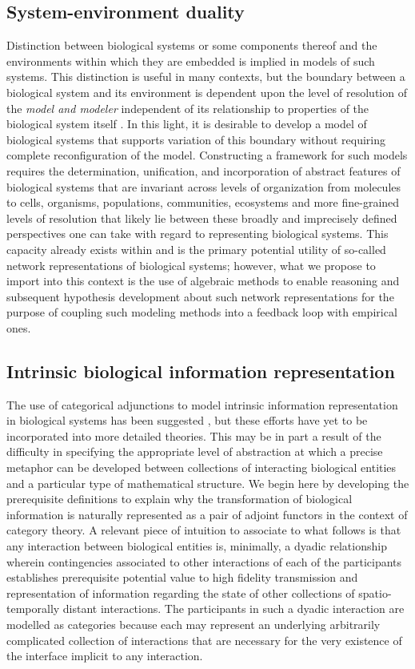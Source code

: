 \documentclass[aps,twocolumn]{revtex4-1}
\begin{document}
\subsection{System-environment duality}
Distinction between biological systems or some components thereof and the environments within which they are embedded is implied in models of such systems. This distinction is useful in many contexts, but the boundary between a biological system and its environment is dependent upon the level of resolution of the \emph{model and modeler} independent of its relationship to properties of the biological system itself \cite{Fontana1996}. In this light, it is desirable to develop a model of biological systems that supports variation of this boundary without requiring complete reconfiguration of the model. Constructing a framework for such models requires the determination, unification, and incorporation of abstract features of biological systems that are invariant across levels of organization from molecules to cells, organisms, populations, communities, ecosystems and more fine-grained levels of resolution that likely lie between these broadly and imprecisely defined perspectives one can take with regard to representing biological systems. This capacity already exists within and is the primary potential utility of so-called network representations of biological systems; however, what we propose to import into this context is the use of algebraic methods to enable reasoning and subsequent hypothesis development about such network representations for the purpose of coupling such modeling methods into a feedback loop with empirical ones.

\subsection{Intrinsic biological information representation}
The use of categorical adjunctions to model intrinsic information representation in biological systems has been suggested \cite{GOGUEN1979,Ellerman2005}, but these efforts have yet to be incorporated into more detailed theories. This may be in part a result of the difficulty in specifying the appropriate level of abstraction at which a precise metaphor can be developed between collections of interacting biological entities and a particular type of mathematical structure. We begin here by developing the prerequisite definitions to explain why the transformation of biological information is naturally represented as a pair of adjoint functors in the context of category theory. A relevant piece of intuition to associate to what follows is that any interaction between biological entities is, minimally, a dyadic relationship wherein contingencies associated to other interactions of each of the participants establishes prerequisite potential value to high fidelity transmission and representation of information regarding the state of other collections of spatio-temporally distant interactions. The participants in such a dyadic interaction are modelled as categories because each may represent an underlying arbitrarily complicated collection of interactions that are necessary for the very existence of the interface implicit to any interaction.
\end{document}
